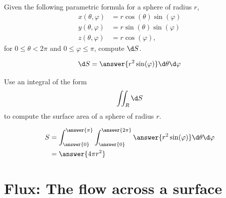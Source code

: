 \documentclass{ximera}
\begin{document}
\begin{question}
  Given the following parametric formula for a sphere of radius $r$,
  \begin{align*}
    x(\theta,\varphi) &= r\cos(\theta)\sin(\varphi)\\
    y(\theta,\varphi) &= r\sin(\theta)\sin(\varphi)\\
    z(\theta,\varphi) &= r\cos(\varphi),
  \end{align*}
  for $0\le \theta< 2\pi$ and $0\le \varphi \le \pi$, compute $\d S$.
  \begin{prompt}
    \[
    \d S = \answer{r^2\sin(\varphi)} \d\theta\d\varphi
    \]
  \end{prompt}
  \begin{question}
    Use an integral of the form
    \[
    \iint_R \d S
    \]
    to compute the surface area of a sphere of radius $r$.
    \begin{prompt}
      \begin{align*}
      S&=\int_{\answer{0}}^{\answer{\pi}}  \int_{\answer{0}}^{\answer{2\pi}}\answer{r^2\sin(\varphi)} \d\theta\d\varphi\\
      &=\answer{4\pi r^2}
      \end{align*}
    \end{prompt}
  \end{question}
\end{question}


\section{Flux: The flow across a surface}
\end{document}
